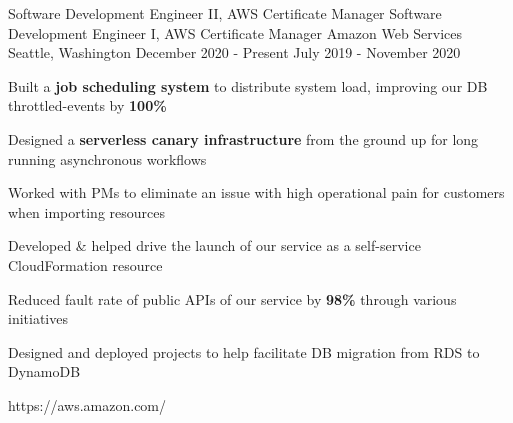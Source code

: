 


\begin{cventries}


\cventrylink
{Software Development Engineer II, AWS Certificate Manager \newline {\vspace{-.75mm}}
    Software Development Engineer I, AWS Certificate Manager}
{Amazon Web Services}
{Seattle, Washington}
{December 2020 - Present \newline {\vspace{-1mm}}
    July 2019 - November 2020}
{ %
\begin{cvitems}
\item{Built a \textbf{job scheduling system} to distribute system load, improving our DB throttled-events by \textbf{100\%}}
\item{Designed a \textbf{serverless canary infrastructure} from the ground up for long running asynchronous workflows}
\item{Worked with PMs to eliminate an issue with high operational pain for customers when importing resources}
\item{Developed \& helped drive the launch of our service as a self-service CloudFormation resource}
\item{Reduced fault rate of public APIs of our service by \textbf{98\%} through various initiatives}
\item{Designed and deployed projects to help facilitate DB migration from RDS to DynamoDB}
\end{cvitems}
}
{https://aws.amazon.com/}



\end{cventries}
